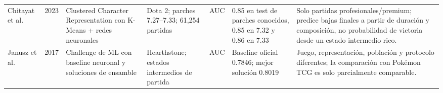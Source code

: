 \begin{table}[!t]
\begin{tabularx}{\textwidth}{@{}l c P{2.4cm} P{2.4cm} P{2.0cm} P{1.8cm} Y@{}}
Chitayat et al. \cite{chitayat_meta_2023} & 2023 & Clustered Character Representation con K-Means + redes neuronales & Dota 2; parches 7.27--7.33; 61,254 partidas & AUC & 0.85 en test de parches conocidos, 0.85 en 7.32 y 0.86 en 7.33 & Solo partidas profesionales/premium; predice bajas finales a partir de duración y composición, no probabilidad de victoria desde un estado intermedio rico.\\

Janusz et al. \cite{janusz_hearthstone_2017} & 2017 & Challenge de ML con baseline neuronal y soluciones de ensamble & Hearthstone; estados intermedios de partida & AUC & Baseline oficial 0.7846; mejor solución 0.8019 & Juego, representación, población y protocolo diferentes; la comparación con Pokémon TCG es solo parcialmente comparable.\\
\bottomrule
\end{tabularx}
\end{table}
